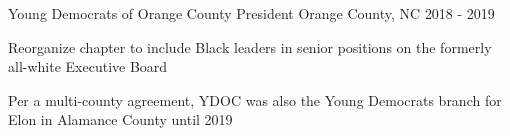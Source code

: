 \begin{cventries}
  \cventry
    {Young Democrats of Orange County} %
    {President} %
    {Orange County, NC} %
    {2018 - 2019} %
    {
      \begin{cvitems} %
        \item {Reorganize chapter to include Black leaders in senior positions on the formerly all-white Executive Board}
        \item {Per a multi-county agreement, YDOC was also the Young Democrats branch for Elon in Alamance County until 2019}
      \end{cvitems}
    }	

\end{cventries}
